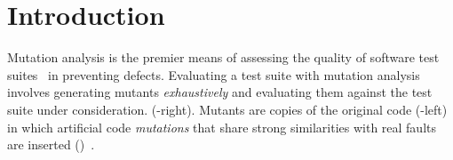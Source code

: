 \documentclass[sigconf,review,anonymous]{acmart}
\begin{document}

\maketitle

\section{Introduction}
Mutation analysis is the premier means of assessing the quality of
software test suites~\cite{papadakis2019mutation} in preventing defects.
Evaluating a test suite with mutation analysis involves
generating mutants \emph{exhaustively} and evaluating them against the test suite under consideration.
(-right).
%
Mutants are copies of the original code (-left) in which artificial code %
\emph{mutations} that share strong similarities with real faults are inserted ()~\cite{daran1996software,just2014are,andrews2005is,andrews2006using}.
\end{document}
